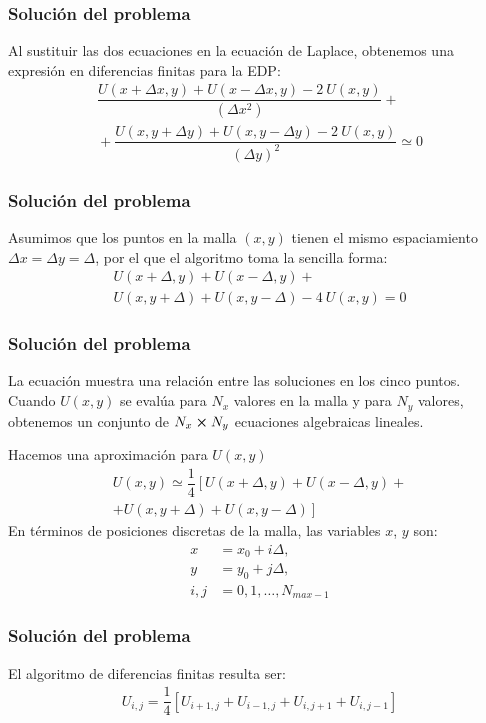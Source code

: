 \begin{frame}
\frametitle{Solución del problema}
Al sustituir las dos ecuaciones en la ecuación de Laplace, obtenemos una expresión en diferencias finitas para la EDP:
\fontsize{12}{12}\selectfont
\begin{align*}
\dfrac{U(x + \Delta x, y) + U(x - \Delta x, y) - 2 \: U(x, y)}{(\Delta x^{2})} + {} \\
{} + \dfrac{U(x, y + \Delta y) + U(x, y-\Delta y) - 2 \: U(x, y)}{(\Delta y)^{2}} \simeq 0
\end{align*}
\end{frame}
\begin{frame}
\frametitle{Solución del problema}
Asumimos que los puntos en la malla $(x,y)$ tienen el mismo espaciamiento $\Delta x =  \Delta y = \Delta$, por el que el algoritmo toma la sencilla forma:
\begin{align*}
U(x + \Delta, y) + U(x - \Delta, y) + {} \\
U(x, y +\Delta)  + U(x, y - \Delta) - 4 \: U(x,y)= 0
\end{align*}
\end{frame}
\begin{frame}
\frametitle{Solución del problema}
La ecuación muestra una relación entre las soluciones en los cinco puntos.
\\
\bigskip
Cuando $U(x,y)$ se evalúa para $N_{x}$ valores en la malla y para $N_{y}$ valores, obtenemos un conjunto de $N_{x} \cp N_{y}$ ecuaciones algebraicas lineales.
\end{frame}
\begin{frame}
Hacemos una aproximación para $U(x,y)$
\begin{align*}
U(x,y) \simeq \dfrac{1}{4} \left[ U(x + \Delta, y) + U(x - \Delta, y) + \right. \\[0.5em]
\left. + U(x, y + \Delta) + U(x, y - \Delta) \right]
\end{align*}
En términos de posiciones discretas de la malla, las variables $x$, $y$ son:
\begin{align*}
x &= x_{0} + i \Delta, \\[0.25em]
y &= y_{0} + j \Delta, \\[0.25em]
i, j &= 0, 1, \ldots, N_{max-1}
\end{align*}
\end{frame}
\begin{frame}
\frametitle{Solución del problema}
El algoritmo de diferencias finitas resulta ser:
\begin{align*}
U_{i, j} = \dfrac{1}{4} [U_{i+1, j} + U_{i-1, j} + U_{i, j+1} + U_{i, j-1}]
\end{align*}
\begin{figure}
	\centering
	
\end{figure}
\end{frame}
